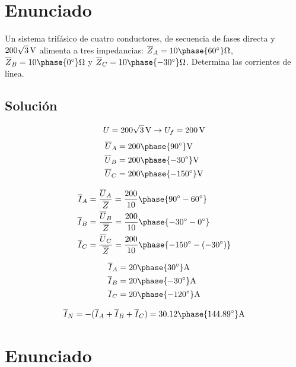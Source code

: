 \section{Enunciado}
Un sistema trifásico de cuatro conductores, de secuencia de fases
directa y $\SI[parse-numbers=false]{200\sqrt{3}}{\volt}$ alimenta a
tres impedancias:
$\overline{Z}_{A} =
{10\phase{\ang{60}}}\unit{\ohm}$,
$\overline{Z}_{B} = {10\phase{\ang{0}}}\unit{\ohm}$
y
$\overline{Z}_{C} =
{10\phase{\ang{-30}}}\unit{\ohm}$. Determina las
corrientes de línea.

\subsection*{Solución}

\[ U = \SI[parse-numbers=false]{200\sqrt{3}}{\volt} \rightarrow U_f =
  \SI{200}{\volt}
\]
\begin{align*}
  \overline{U}_A &= {200\phase{\ang{90}}}\unit{\volt}\\
  \overline{U}_B &= {200\phase{\ang{-30}}}\unit{\volt}\\
  \overline{U}_C &= {200\phase{\ang{-150}}}\unit{\volt}\\
\end{align*}

\begin{align*}
  \overline{I}_A &= \frac{\overline{U}_A}{\overline{Z}} = \frac{200}{10}\phase{\ang{90} - \ang{60}} \\
  \overline{I}_B &= \frac{\overline{U}_B}{\overline{Z}} = \frac{200}{10}\phase{\ang{-30} - \ang{0}}\\
  \overline{I}_C &= \frac{\overline{U}_C}{\overline{Z}} = \frac{200}{10}\phase{\ang{-150} - (\ang{-30})}
\end{align*}

 \begin{align*}
   \overline{I}_A &= {20\phase{\ang{30}}}\unit{\ampere}\\
   \overline{I}_B &= {20\phase{\ang{-30}}}\unit{\ampere}\\
   \overline{I}_C &= {20\phase{\ang{-120}}}\unit{\ampere}
 \end{align*}

 \[
   \overline{I}_N = -(\overline{I}_A + \overline{I}_B +
   \overline{I}_C) =
   {30.12\phase{\ang{144.89}}}\unit{\ampere}
 \]


 \section{Enunciado}

